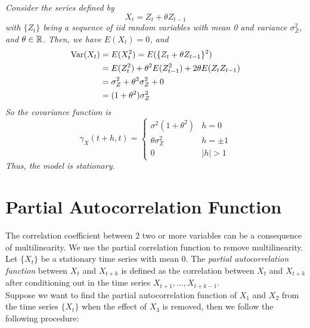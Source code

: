 \begin{example}
    \emph{
        Consider the series defined by
        \[X_t = Z_t + \theta Z_{t-1}\]
        with $\{Z_t\}$ being a sequence of iid random variables with mean 0 and variance $\sigma_Z^2$, and $\theta \in \mathbb{R}$. Then, we have $E(X_t) = 0$, and
        \begin{align*}
            \operatorname{Var}(X_t) &= E(X_t^2) = E(\{Z_t + \theta Z_{t-1}\}^2)\\
            &= E(Z_t^2) + \theta^2 E(Z_{t-1}^2) + 2\theta E(Z_tZ_{t-1})\\
            &= \sigma_Z^2 + \theta^2\sigma_Z^2 + 0\\
            &= (1+\theta^2)\sigma_Z^2
        \end{align*}
        So the covariance function is 
        \[\gamma_X(t+h,t) = \begin{cases}
            \sigma^2(1 + \theta^2) & h = 0\\
            \theta\sigma_Z^2 & h = \pm 1\\
            0 & |h| > 1
        \end{cases}\]
        Thus, the model is stationary.
        }
\end{example}

\section{Partial Autocorrelation Function}

The correlation coefficient between 2 two or more variables can be a consequence of multilinearity. We use the partial correlation function to remove multilinearity. Let $\{X_t\}$ be a stationary time series with mean 0. The \emph{partial autocorrelation function} between $X_t$ and $X_{t+k}$ is defined as the correlation between $X_t$ and $X_{t+k}$ after conditioning out in the time series $X_{t+1},\ldots, X_{t+k-1}$.\\

Suppose we want to find the partial autocorrelation function of $X_1$ and $X_2$ from the time series $\{X_t\}$ when the effect of $X_3$ is removed, then we follow the following procedure:

